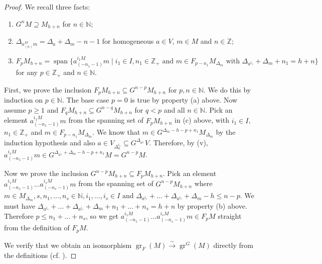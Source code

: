 \documentclass[a4paper, 12pt, reqno]{amsart}
\theoremstyle{remark}
\DeclareMathOperator{\gr}{gr}
\DeclareMathOperator{\vspan}{span}
\begin{document}
\begin{proof}
  We recall three facts:
  \begin{enumerate}[label={(\alph*)}]
  \item $G^nM \supseteq M_{h + n}$ for $n \in \mathbb{N}$;
  \item $\Delta_{a^M_{(n)}m} = \Delta_a + \Delta_m - n - 1$ for homogeneous $a \in V$, $m \in M$ and $n \in \mathbb{Z}$;
  \item $F_pM_{h + n} = \vspan\{a^{i_1M}_{(-n_1 - 1)}m \mid i_1 \in I, n_1 \in \mathbb{Z}_+\text{ and }m \in F_{p - n_1}M_{\Delta_m}\text{ with }\Delta_{a^{i_1}} + \Delta_m + n_1 = h + n\}$ for any $p \in \mathbb{Z}_+$ and $n \in \mathbb{N}$.
  \end{enumerate}
  First, we prove the inclusion $F_pM_{h + n} \subseteq G^{n - p}M_{h + n}$ for $p, n \in \mathbb{N}$.
  We do this by induction on $p \in \mathbb{N}$.
  The base case $p = 0$ is true by property (a) above.
  Now assume $p \ge 1$ and $F_qM_{h + n} \subseteq G^{n - q}M_{h + n}$ for $q < p$ and all $n \in \mathbb{N}$.
  Pick an element $a^{i_1M}_{(-n_1 - 1)}m$ from the spanning set of $F_pM_{h + n}$ in (c) above, with $i_1 \in I$, $n_1 \in \mathbb{Z}_+$ and $m \in F_{p - n_1}M_{\Delta_m}$.
  We know that $m \in G^{\Delta_m - h - p + n_1}M_{\Delta_m}$ by the induction hypothesis and also $a \in V_{\Delta_a^{i_1}} \subseteq G^{\Delta_{a^{i_1}}}V$.
  Therefore, by (v), $a^{i_1M}_{(-n_1 - 1)}m \in G^{\Delta_{a^{i_1}} + \Delta_m - h - p + n_1}M = G^{n - p}M$.

  Now we prove the inclusion $G^{n - p}M_{h + n} \subseteq F_pM_{h + n}$.
  Pick an element $a^{i_1M}_{(-n_1 - 1)}\dots a^{i_sM}_{(-n_s - 1)}m$ from the spanning set of $G^{n - p}M_{h + n}$ where $m \in M_{\Delta_m}, s, n_1, \dots, n_s \in \mathbb{N}, i_1, \dots, i_s \in I\text{ and }\Delta_{a^{i_1}} + \dots + \Delta_{a^{i_s}} + \Delta_m - h \le n - p$.
  We must have $\Delta_{a^{i_1}} + \dots + \Delta_{a^{i_s}} + \Delta_m + n_1 + \dots + n_s = h + n$ by property (b) above.
  Therefore $p \le n_1 + \dots + n_s$, so we get $a^{i_1M}_{(-n_1 - 1)}\dots a^{i_sM}_{(-n_s - 1)}m \in F_pM$ straight from the definition of $F_pM$.

  We verify that we obtain an isomorphism $\gr_F(M) \xrightarrow{\sim} \gr^G(M)$ directly from the definitions (cf. ).
\end{proof}
\end{document}
